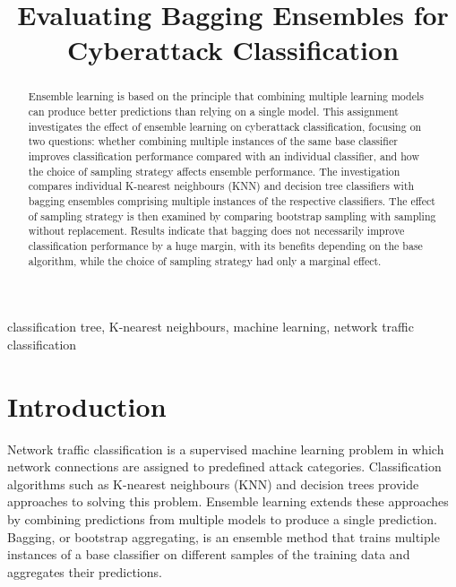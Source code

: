 \documentclass[conference, 10pt]{IEEEtran}
\begin{document}
\title{Evaluating Bagging Ensembles for Cyberattack Classification}

\author{
}

\maketitle

\begin{abstract}
    Ensemble learning is based on the principle that combining multiple learning models can produce better 
    predictions than relying on a single model. This assignment investigates the effect of ensemble learning 
    on cyberattack classification, focusing on two questions: whether combining multiple instances of the same 
    base classifier improves classification performance compared with an individual classifier, and how the choice 
    of sampling strategy affects ensemble performance. The investigation compares individual K-nearest neighbours 
    (KNN) and decision tree classifiers with bagging ensembles comprising multiple instances of the respective 
    classifiers. The effect of sampling strategy is then examined by comparing bootstrap sampling with sampling 
    without replacement. Results indicate that bagging does not necessarily improve classification performance by 
    a huge margin, with its benefits depending on the base algorithm, while the choice 
    of sampling strategy had only a marginal effect.
\end{abstract}

\begin{IEEEkeywords}
classification tree, K-nearest neighbours, machine learning, network traffic classification
\end{IEEEkeywords}

\section{Introduction}

Network traffic classification is a supervised machine learning problem in which network connections are assigned 
to predefined attack categories. Classification algorithms such as K-nearest neighbours (KNN) and decision trees 
provide approaches to solving this problem. Ensemble learning extends these approaches by combining predictions 
from multiple models to produce a single prediction. Bagging, or bootstrap aggregating, is an ensemble method 
that trains multiple instances of a base classifier on different samples of the training data and aggregates 
their predictions.
\end{document}
